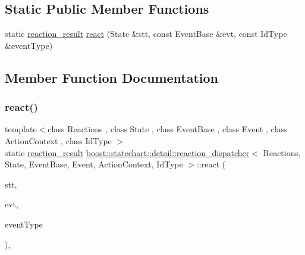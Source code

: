 \subsection*{Static Public Member Functions}
\begin{DoxyCompactItemize}
\item 
static \mbox{\hyperlink{namespaceboost_1_1statechart_1_1detail_ab091bbb4c29327fb46ee479ea1b7255b}{reaction\+\_\+result}} \mbox{\hyperlink{classboost_1_1statechart_1_1detail_1_1reaction__dispatcher_aeded743093739575529fa22b3a63b27f}{react}} (State \&stt, const Event\+Base \&evt, const Id\+Type \&event\+Type)
\end{DoxyCompactItemize}


\subsection{Member Function Documentation}
\mbox{\label{classboost_1_1statechart_1_1detail_1_1reaction__dispatcher_aeded743093739575529fa22b3a63b27f}} 
\subsubsection{\texorpdfstring{react()}{react()}}
{\footnotesize\ttfamily template$<$class Reactions , class State , class Event\+Base , class Event , class Action\+Context , class Id\+Type $>$ \\
static \mbox{\hyperlink{namespaceboost_1_1statechart_1_1detail_ab091bbb4c29327fb46ee479ea1b7255b}{reaction\+\_\+result}} \mbox{\hyperlink{classboost_1_1statechart_1_1detail_1_1reaction__dispatcher}{boost\+::statechart\+::detail\+::reaction\+\_\+dispatcher}}$<$ Reactions, State, Event\+Base, Event, Action\+Context, Id\+Type $>$\+::react (\begin{DoxyParamCaption}\item[{State \&}]{stt,  }\item[{const Event\+Base \&}]{evt,  }\item[{const Id\+Type \&}]{event\+Type }\end{DoxyParamCaption})\hspace{0.3cm}{\ttfamily [inline]}, {\ttfamily [static]}}

